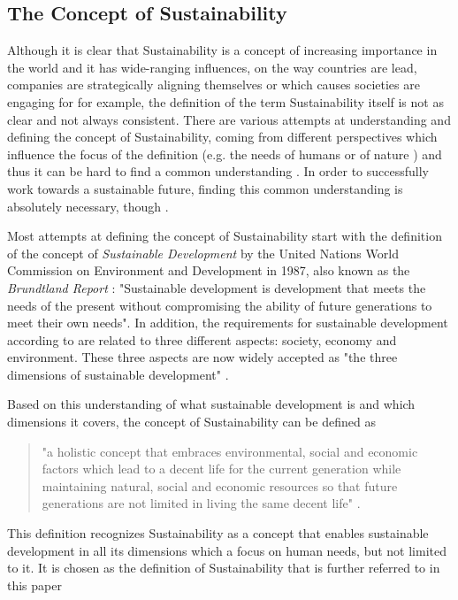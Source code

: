 \documentclass[oribibl]{llncs}
\begin{document}
\subsection{The Concept of Sustainability}
Although it is clear that Sustainability is a concept of increasing importance in the world and it has wide-ranging influences, on the way countries are lead, companies are strategically aligning themselves or which causes societies are engaging for for example, the definition of the term Sustainability itself is not as clear and not always consistent. %
 There are various attempts at understanding and defining the concept of Sustainability, coming from different perspectives which influence the focus of the definition (e.g. the needs of humans or of nature \cite{gladwin_shifting_1995}) and thus it can be hard to find a common understanding \cite{jamieson_sustainability_1998}%
. In order to successfully work towards a sustainable future, finding this common understanding is absolutely necessary, though \cite{jamieson_sustainability_1998}.

Most attempts at defining the concept of Sustainability start with the definition of the concept of \textit{Sustainable Development} by the United Nations World Commission on Environment and Development in 1987, also known as the \textit{Brundtland Report} %
: "Sustainable development is development that meets the needs of the present without compromising the ability of future generations to meet their own needs"\cite{Brundtland1987}. %
 In addition, the requirements for sustainable development according to \cite{Brundtland1987} are related to three different aspects: society, economy and environment. These three aspects are now widely accepted as "the three dimensions of sustainable development" \cite{UN_transform_15}.

Based on this understanding of what sustainable development is and which dimensions it covers, the concept of Sustainability can be defined as \begin{quote}
	"a holistic concept that embraces environmental, social and economic factors which lead to a decent life for the current generation while maintaining natural, social and economic resources so that future generations are not limited in living the same decent life" \cite{buchner_sust_16}.%
\end{quote} 
This definition recognizes Sustainability as a concept that enables sustainable development in all its dimensions which a focus on human needs, but not limited to it. It is chosen as the definition of Sustainability that is further referred to in this paper
\end{document}

